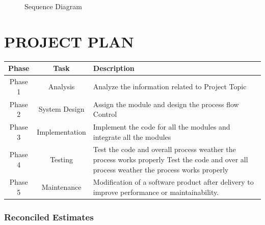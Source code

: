 \documentclass[oneside,a4paper,12pt]{report}
\begin{document}
\begin{center}
	\begin{figure}[!htbp]
		\centering
 	    \caption{Sequence Diagram}
	    \label{fig:Sequence Diagram}
	\end{figure}
\end{center}

\chapter{PROJECT PLAN}
\def\arraystretch{1.3}
  \begin{tabular}{|c|c|p{9.2cm}|}
  \hline    
\textbf{Phase}	&\textbf{Task}	&\textbf{Description}	\\ \hline	   
Phase 1 &Analysis &Analyze the information related to Project Topic \\ \hline
Phase 2 & System Design &Assign the module and design the process flow Control \\ \hline
Phase 3 &Implementation &Implement the code for all the modules and integrate all the modules \\ \hline
Phase 4 &Testing &Test the code and overall process weather the process works
properly Test the code and over all process weather the process works properly \\ \hline
Phase 5 &Maintenance & Modification of a software product after delivery to improve performance or maintainability. \\ \hline
\end{tabular}


\newpage
\subsection{Reconciled Estimates}
\end{document}
